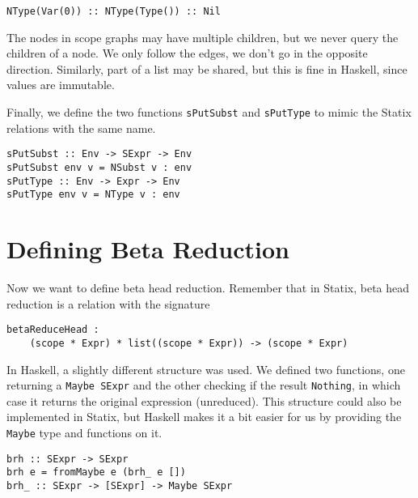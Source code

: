 \begin{lstlisting}
NType(Var(0)) :: NType(Type()) :: Nil
\end{lstlisting}

The nodes in scope graphs may have multiple children, but we never query the children of a node. We only follow the edges, we don't go in the opposite direction. Similarly, part of a list may be shared, but this is fine in Haskell, since values are immutable. 

Finally, we define the two functions \verb|sPutSubst| and \verb|sPutType| to mimic the Statix relations with the same name.
\begin{lstlisting}
sPutSubst :: Env -> SExpr -> Env
sPutSubst env v = NSubst v : env
sPutType :: Env -> Expr -> Env
sPutType env v = NType v : env
\end{lstlisting}

\section{Defining Beta Reduction}

Now we want to define beta head reduction. Remember that in Statix, beta head reduction is a relation with the signature
\begin{lstlisting}
betaReduceHead : 
	(scope * Expr) * list((scope * Expr)) -> (scope * Expr)
\end{lstlisting}

In Haskell, a slightly different structure was used. We defined two functions, one returning a \verb|Maybe SExpr| and the other checking if the result \verb|Nothing|, in which case it returns the original expression (unreduced). This structure could also be implemented in Statix, but Haskell makes it a bit easier for us by providing the \verb|Maybe| type and functions on it.
\begin{lstlisting}
brh :: SExpr -> SExpr
brh e = fromMaybe e (brh_ e [])
brh_ :: SExpr -> [SExpr] -> Maybe SExpr
\end{lstlisting}


